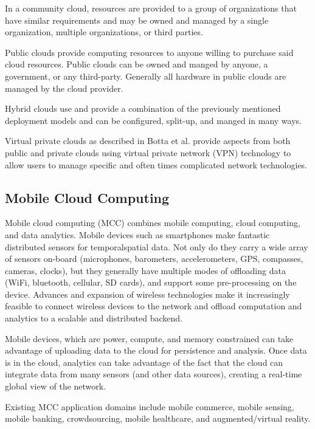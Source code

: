 \documentclass[]{article}
\begin{document}
In a community cloud, resources are provided to a group of organizations that have similar requirements and may be owned and managed by a single organization, multiple organizations, or third parties.

Public clouds provide computing resources to anyone willing to purchase  said cloud resources. Public clouds can be owned and manged by anyone, a government, or any third-party. Generally all hardware in public clouds are managed by the cloud provider.

Hybrid clouds use and provide a combination of the previously mentioned deployment models and can be configured, split-up, and manged in many ways.

Virtual private clouds as described in Botta et al.\cite{botta_integration_2016} provide aspects from both public and private clouds using virtual private network (VPN) technology to allow users to manage specific and often times complicated network technologies.

\subsection{Mobile Cloud Computing} \label{ssec:mobile-cloud-computing}
Mobile cloud computing (MCC) combines mobile computing, cloud computing, and data analytics\cite{wang_mobile_survey_2015}. Mobile devices such as smartphones make fantastic distributed sensors for temporalspatial data. Not only do they carry a wide array of sensors on-board (microphones, barometers, accelerometers, GPS, compasses, cameras, clocks), but they generally have multiple modes of offloading data (WiFi, bluetooth, cellular, SD cards), and support some pre-processing on the device. Advances and expansion of wireless technologies make it increasingly feasible to connect wireless devices to the network and offload computation and analytics to a scalable and distributed backend\cite{barbera_offload_2013}.

Mobile devices, which are power, compute, and memory constrained can take advantage of uploading data to the cloud for persistence and analysis. Once data is in the cloud, analytics can take advantage of the fact that the cloud can integrate data from many sensors (and other data sources), creating a real-time global view of the network.

Existing MCC application domains include mobile commerce, mobile sensing, mobile banking, crowdsourcing, mobile healthcare, and augmented/virtual reality.
\end{document}
